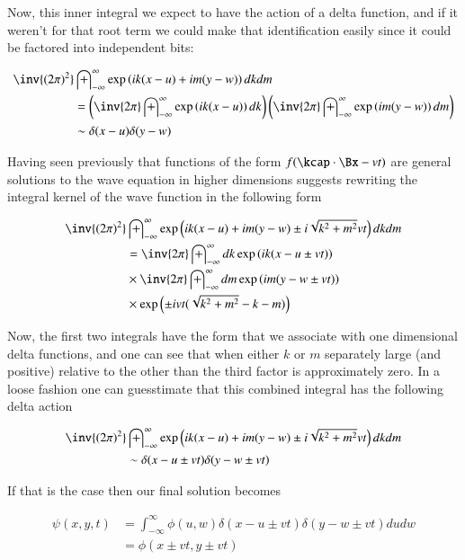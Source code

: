\documentclass{article}
\newcommand{\IIinf}[0]{ \int_{-\infty}^\infty }
\begin{document}
Now, this inner integral we expect to have the action of a delta function, and if it weren't for that root term we could make that
identification easily since it could be factored into independent bits:

\begin{align*}
\inv{({2\pi})^2} &\IIinf \exp\left( i k (x-u) + i m (y-w) \right) dk dm  \\
&=
\left(\inv{{2\pi}} \IIinf \exp\left( i k (x-u) \right) dk \right)
\left(\inv{{2\pi}} \IIinf \exp\left( i m (y-w) \right) dm \right) \\
&\sim \delta( x - u)\delta( y - w)
\end{align*}

Having seen previously that functions of the form $f(\kcap \cdot \Bx -v t)$ are general solutions to the wave equation in higher 
dimensions suggests rewriting the integral kernel of the wave function in the following form

\begin{align*}
\inv{({2\pi})^2} &\IIinf \exp\left( i k (x-u) + i m (y-w) \pm i \sqrt{k^2 + m^2} v t \right) dk dm \\
&=
\inv{{2\pi}} \IIinf dk \exp\left( i k (x - u \pm v t) \right) \\
&\times \inv{{2\pi}} \IIinf dm \exp\left( i m (y - w \pm v t) \right) \\
&\times \exp\left( \pm i v t ( \sqrt{k^2 + m^2} -k - m ) \right) \\
\end{align*}

Now, the first two integrals have the form that we associate with one dimensional delta functions, and one can see that when either 
$k$ or $m$ separately large (and positive) relative to the other than the third factor is approximately zero.  In a loose fashion one
can guesstimate that this combined integral has the following delta action

\begin{align*}
\inv{({2\pi})^2} &\IIinf \exp\left( i k (x-u) + i m (y-w) \pm i \sqrt{k^2 + m^2} v t \right) dk dm \\
&\sim 
\delta( x -u \pm vt )
\delta( y -w \pm vt )
\end{align*}

If that is the case then our final solution becomes

\begin{align*}
\psi(x,y,t) 
&= \IIinf \phi(u,w) \delta( x -u \pm vt ) \delta( y -w \pm vt ) du dw \\
&= \phi( x \pm vt, y \pm vt ) \\
\end{align*}
\end{document}
